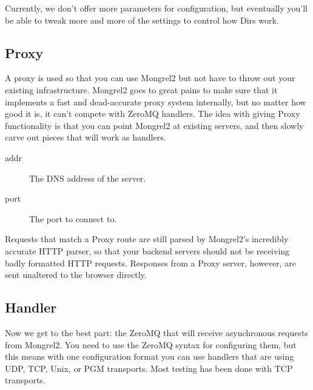 Currently, we don't offer more parameters for configuration, but eventually you'll be able to tweak more and
more of the settings to control how Dirs work.

\subsection{Proxy}

A proxy is used so that you can use Mongrel2 but not have to throw out your
existing infrastructure.  Mongrel2 goes to great pains to make sure that it
implements a fast and dead-accurate proxy system internally, but no matter how
good it is, it can't compete with ZeroMQ handlers.  The idea with giving Proxy
functionality is that you can point Mongrel2 at existing servers, and then slowly
carve out pieces that will work as handlers.


\begin{description}
\item[addr] The DNS address of the server.
\item[port] The port to connect to.
\end{description}

Requests that match a Proxy route are still parsed by Mongrel2's incredibly accurate
HTTP parser, so that your backend servers should not be receiving badly formatted
HTTP requests.  Responses from a Proxy server, however, are sent unaltered to the
browser directly.


\subsection{Handler}

Now we get to the best part: the ZeroMQ  that will receive asynchronous requests
from Mongrel2.  You need to use the ZeroMQ syntax for configuring them, but this means with one
configuration format you can use handlers that are using UDP, TCP, Unix, or PGM transports.  Most
testing has been done with TCP transports.

